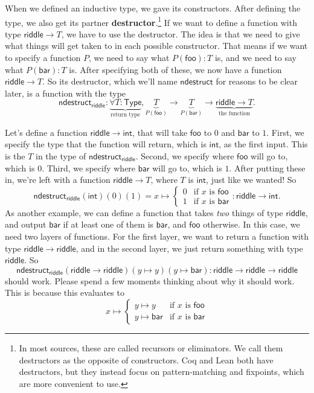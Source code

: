 \documentclass[11pt,paper=letter]{scrartcl}
\newcommand{\sf}{\mathsf}
\newcommand{\type}{\mathsf{Type}}
\begin{document}
When we defined an inductive type, we gave its constructors. After defining the type, we also get its partner \textbf{destructor}.\footnote{In most sources, these are called recursors or eliminators. We call them destructors as the opposite of constructors. Coq and Lean both have destructors, but they instead focus on pattern-matching and fixpoints, which are more convenient to use.} If we want to define a function with type $\sf{riddle} \to T$, we have to use the destructor. The idea is that we need to give what things will get taken to in each possible constructor. That means if we want to specify a function $P$, we need to say what $P(\sf{foo}) : T$ is, and we need to say what $P(\sf{bar}) : T$ is. After specifying both of these, we now have a function $\sf{riddle} \to T$. So its destructor, which we'll name $\sf{ndestruct}$ for reasons to be clear later, is a function with the type \[
\sf{ndestruct}_{\sf{riddle}}:
\underbrace{\forall T: \type}_{\text{return type}},
\underbrace{T}_{P(\sf{foo})} \to
\underbrace{T}_{P(\sf{bar})} \to
\underbrace{\sf{riddle} \to T}_{\text{the function}}.
\]

Let's define a function $\sf{riddle} \to \sf{int}$, that will take $\sf{foo}$ to $0$ and $\sf{bar}$ to $1$. First, we specify the type that the function will return, which is $\sf{int}$, as the first input. This is the $T$ in the type of $\sf{ndestruct}_\sf{riddle}$. Second, we specify where $\sf{foo}$ will go to, which is $0$. Third, we specify where $\sf{bar}$ will go to, which is $1$. After putting these in, we're left with a function $\sf{riddle} \to T$, where $T$ is $\sf{int}$, just like we wanted! So \[
  \sf{ndestruct}_{\sf{riddle}}(\sf{int})(0)(1) = x \mapsto
  \begin{cases}
  0 & \text{if $x$ is }\sf{foo} \\
  1 & \text{if $x$ is }\sf{bar}
  \end{cases} : \sf{riddle} \to \sf{int}.
\]
As another example, we can define a function that takes \emph{two} things of type $\sf{riddle}$, and output $\sf{bar}$ if at least one of them is $\sf{bar}$, and $\sf{foo}$ otherwise. In this case, we need two layers of functions. For the first layer, we want to return a function with type $\sf{riddle} \to \sf{riddle}$, and in the second layer, we just return something with type $\sf{riddle}$. So \[
  \sf{ndestruct}_\sf{riddle}(
  \sf{riddle} \to \sf{riddle})(
  y \mapsto y)(
  y \mapsto \sf{bar}
  ) : \sf{riddle} \to \sf{riddle} \to \sf{riddle}
\]
should work. Please spend a few moments thinking about why it should work. This is because this evaluates to \[
  x \mapsto
  \begin{cases}
  y \mapsto y & \text{if $x$ is }\sf{foo} \\
  y \mapsto \sf{bar} & \text{if $x$ is }\sf{bar}
  \end{cases}
\]
\end{document}
